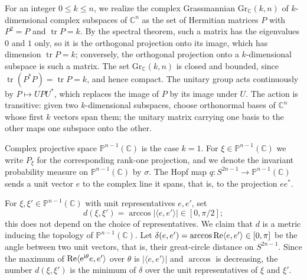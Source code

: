 For an integer $0\leq k\leq n$, we realize the complex Grassmannian $\mathrm{Gr}_{\mathbb C}(k,n)$ of $k$-dimensional complex subspaces of $\mathbb C^n$ as the set of Hermitian matrices $P$ with $P^2=P$ and $\operatorname{tr}P=k$. By the spectral theorem, such a matrix has the eigenvalues $0$ and $1$ only, so it is the orthogonal projection onto its image, which has dimension $\operatorname{tr}P=k$; conversely, the orthogonal projection onto a $k$-dimensional subspace is such a matrix. The set $\mathrm{Gr}_{\mathbb C}(k,n)$ is closed and bounded, since $\operatorname{tr}(P^*P)=\operatorname{tr}P=k$, and hence compact. The unitary group acts continuously by $P\mapsto UPU^*$, which replaces the image of $P$ by its image under $U$. The action is transitive: given two $k$-dimensional subspaces, choose orthonormal bases of $\mathbb C^n$ whose first $k$ vectors span them; the unitary matrix carrying one basis to the other maps one subspace onto the other.

Complex projective space $\mathbb P^{n-1}(\mathbb C)$ is the case $k=1$. For $\xi\in\mathbb P^{n-1}(\mathbb C)$ we write $P_\xi$ for the corresponding rank-one projection, and we denote the invariant probability measure on $\mathbb P^{n-1}(\mathbb C)$ by $\sigma$. The Hopf map $q\colon S^{2n-1}\to\mathbb P^{n-1}(\mathbb C)$ sends a unit vector $e$ to the complex line it spans, that is, to the projection $ee^*$.

For $\xi,\xi'\in\mathbb P^{n-1}(\mathbb C)$ with unit representatives $e,e'$, set
\[
 d(\xi,\xi')=\arccos|\langle e,e'\rangle|\in[0,\pi/2];
\]
this does not depend on the choice of representatives. We claim that $d$ is a metric inducing the topology of $\mathbb P^{n-1}(\mathbb C)$. Let $\delta(e,e')=\arccos\operatorname{Re}\langle e,e'\rangle\in[0,\pi]$ be the angle between two unit vectors, that is, their great-circle distance on $S^{2n-1}$. Since the maximum of $\operatorname{Re}\langle\mathrm e^{\mathrm i\theta}e,e'\rangle$ over $\theta$ is $|\langle e,e'\rangle|$ and $\arccos$ is decreasing, the number $d(\xi,\xi')$ is the minimum of $\delta$ over the unit representatives of $\xi$ and $\xi'$.

